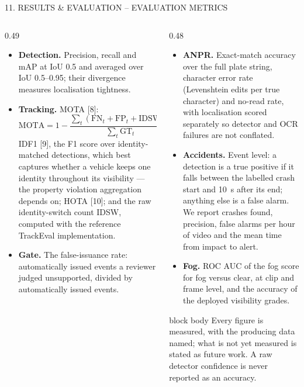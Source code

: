 \documentclass[aspectratio=169,10pt,t]{beamer}
\begin{document}
\begin{frame}{11. RESULTS \& EVALUATION -- EVALUATION METRICS}
\scriptsize
\begin{columns}[T,onlytextwidth]
\begin{column}{0.49\textwidth}
\begin{itemize}\setlength{\itemsep}{0.35em}
  \item \textbf{Detection.} Precision, recall and mAP at IoU 0.5 and averaged over IoU 0.5--0.95; their divergence
        measures localisation tightness.
  \item \textbf{Tracking.} MOTA [8]:\\[0.2em]
        $\text{MOTA}=1-\dfrac{\sum_t(\mathrm{FN}_t+\mathrm{FP}_t+\mathrm{IDSW}_t)}{\sum_t\mathrm{GT}_t}$\\[0.3em]
        IDF1 [9], the F1 score over identity-matched detections, which best captures whether a vehicle keeps one
        identity throughout its visibility --- the property violation aggregation depends on; HOTA [10]; and the raw
        identity-switch count IDSW, computed with the reference TrackEval implementation.
  \item \textbf{Gate.} The false-issuance rate: automatically issued events a reviewer judged unsupported, divided by
        automatically issued events.
\end{itemize}
\end{column}
\begin{column}{0.48\textwidth}
\begin{itemize}\setlength{\itemsep}{0.35em}
  \item \textbf{ANPR.} Exact-match accuracy over the full plate string, character error rate (Levenshtein edits per
        true character) and no-read rate, with localisation scored separately so detector and OCR failures are not
        conflated.
  \item \textbf{Accidents.} Event level: a detection is a true positive if it falls between the labelled crash start
        and 10~s after its end; anything else is a false alarm. We report crashes found, precision, false alarms per
        hour of video and the mean time from impact to alert.
  \item \textbf{Fog.} ROC AUC of the fog score for fog versus clear, at clip and frame level, and the accuracy of the
        deployed visibility grades.
\end{itemize}
\vspace{0.4em}
\begin{beamercolorbox}[sep=0.5em,rounded=true]{block body}
\scriptsize Every figure is measured, with the producing data named; what is not yet measured is stated as future
work. A raw detector confidence is never reported as an accuracy.
\end{beamercolorbox}
\end{column}
\end{columns}
\end{frame}
\end{document}
